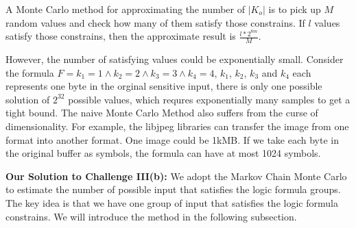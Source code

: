 A Monte Carlo method for approximating the number of $|K_o|$ is to pick up 
$M$ random values and check how many of them satisfy those constrains. If $l$ values
satisfy those constrains, then the approximate result is $\frac{l*2^{8m}}{M}$.

However, the number of satisfying values could be exponentially small. Consider the formula
$F={k_1} = 1\land{k_2} = 2\land{k_3} = 3\land{k_4} = 4$, $k_1$, $k_2$, $k_3$ and $k_4$ each represents
one byte in the orginal sensitive input, there is only one possible solution of $2^{32}$ possible
values, which requres exponentially many samples to get a tight bound. 
The naive Monte Carlo Method also suffers from the curse of dimensionality. For example, 
the libjpeg libraries can transfer the image from one format into another format. One image could
be 1kMB. If we take each byte in the original buffer as symbols, the formula can have at most
1024 symbols. 

\vspace*{6pt}
\textbf{Our Solution to Challenge III(b):}
We adopt the Markov Chain Monte Carlo to estimate the number of possible input
that satisfies the logic formula groups. The key idea is that we have one group of input that satisfies
the logic formula constrains.  We will
introduce the method in the following subsection.
